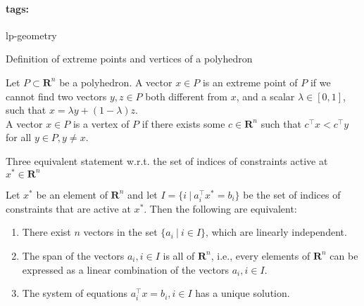 \documentclass[11pt]{article}
\newcommand{\reals}{\mathbf{R}}
\newcommand*{\tags}[1]{\paragraph{tags: }#1\bigskip}
\newcommand*{\xfield}[1]{\begin{mdframed}\centering #1\end{mdframed}\bigskip}
\newenvironment{field}{}{}
\newenvironment{note}{}{}
\begin{document}
\tags{lp-geometry}
\begin{note}
  \xfield{Definition of extreme points and vertices of a polyhedron}
  \begin{field}
    Let \(P \subset \reals^n\) be a polyhedron. A vector \(x \in P\)
    is an extreme point of \(P\) if we cannot find two vectors
    \(y,z \in P\) both different from \(x\), and a scalar
    \(\lambda \in [0,1]\), such that
    \(x = \lambda y + (1 - \lambda) z\).
    \\

    A vector \(x \in P\) is a vertex of \(P\) if there exists some
    \(c \in \reals^n\) such that \(c^\top x < c^\top y\) for all
    \(y \in P, y \not = x\).
  \end{field}
\end{note}
%
\begin{note}
  \xfield{Three equivalent statement w.r.t. the set of indices of
    constraints active at \(x^* \in \reals^n\)}
  \begin{field}
    Let \(x^*\) be an element of \(\reals^n\) and let \(I = \{ i ~|~
    a^\top_i x^* = b_i\}\) be the set of indices of constraints that
    are active at \(x^*\). Then the following are equivalent:
    \begin{enumerate}
    \item There exist \(n\) vectors in the set \(\{a_i ~|~ i \in
      I\}\), which are linearly independent.
    \item The span of the vectors \(a_i, i \in I\) is all of
      \(\reals^n\), i.e., every elements of \(\reals^n\) can be
      expressed as a linear combination of the vectors
      \(a_i, i \in I\).
    \item The system of equations \(a^\top_i x = b_i, i \in I\) has a
      unique solution.
    \end{enumerate}
  \end{field}
\end{note}
\end{document}

